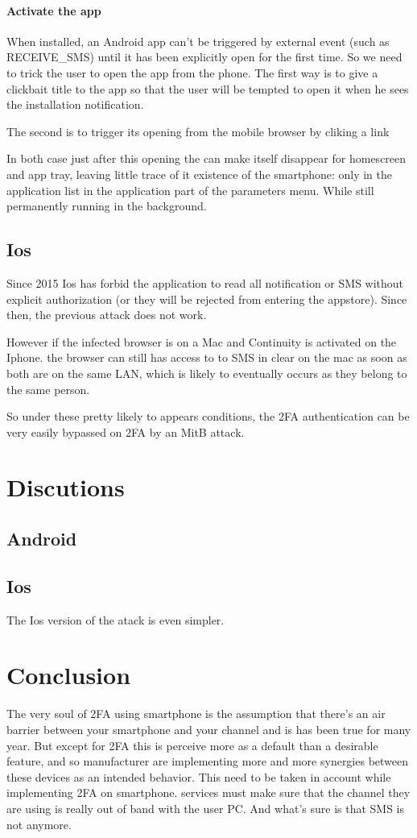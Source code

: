 \documentclass[11pt, a4paper,twocolumn]{article}
\begin{document}
\paragraph{Activate the app} When installed, an Android app can't be triggered by external event (such as RECEIVE\_SMS) until it has been explicitly open for the first time. So we need to trick the user to open the app from the phone. The 
first way is to give a clickbait title to the app so that the user will be tempted to open it when he sees the installation notification.

The second is to trigger its opening from the mobile browser by cliking a link

In both case just after this opening the can make itself disappear for homescreen and app tray, leaving little trace of it existence of the smartphone: only in the application list in the application part of the parameters menu. While still permanently running in the background.

\subsection{Ios}
Since 2015 Ios has forbid the application to read all notification or SMS without explicit authorization (or they will be rejected from entering the appstore). 
Since then, the previous attack does not work. 

However if the infected browser is on a Mac and Continuity is activated on the Iphone. the browser can still has access to to SMS in clear on the mac as soon as both are on the same LAN, which is likely to eventually occurs as they belong to the same person. 

So under these pretty likely to appears conditions, the 2FA authentication can be very easily bypassed on 2FA by an MitB attack.


\section{Discutions} 
\subsection{Android}
\subsection{Ios}
The Ios version of the atack is even simpler. 
\section{Conclusion}

The very soul of 2FA using smartphone is the assumption that there's an air barrier between your smartphone and your channel and is has been true for many year. But except for 2FA this is perceive more as a default than a desirable feature, and so manufacturer are implementing more and more synergies between these devices as an intended behavior. This need to be taken in account while implementing 2FA on smartphone. services must make sure that the channel they are using is really out of band with the user PC. And what's sure is that SMS is not anymore.

 

\end{document}
